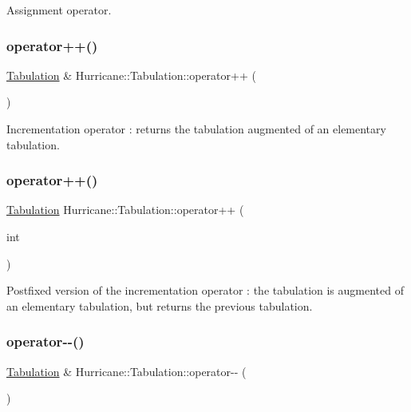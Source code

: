 Assignment operator. \mbox{\label{classHurricane_1_1Tabulation_ad108353099b0755a45a18ec1ab6c0b7c}} 
\subsubsection{\texorpdfstring{operator++()}{operator++()}\hspace{0.1cm}{\footnotesize\ttfamily [1/2]}}
{\footnotesize\ttfamily \mbox{\hyperlink{classHurricane_1_1Tabulation}{Tabulation}} \& Hurricane\+::\+Tabulation\+::operator++ (\begin{DoxyParamCaption}{ }\end{DoxyParamCaption})}

Incrementation operator \+: returns the tabulation augmented of an elementary tabulation. \mbox{\label{classHurricane_1_1Tabulation_ae609e34474086ac1b9748368d798acae}} 
\subsubsection{\texorpdfstring{operator++()}{operator++()}\hspace{0.1cm}{\footnotesize\ttfamily [2/2]}}
{\footnotesize\ttfamily \mbox{\hyperlink{classHurricane_1_1Tabulation}{Tabulation}} Hurricane\+::\+Tabulation\+::operator++ (\begin{DoxyParamCaption}\item[{int}]{ }\end{DoxyParamCaption})}

Postfixed version of the incrementation operator \+: the tabulation is augmented of an elementary tabulation, but returns the previous tabulation. \mbox{\label{classHurricane_1_1Tabulation_af95446070605eb5d2ce89e9b8b3049be}} 
\subsubsection{\texorpdfstring{operator-\/-\/()}{operator--()}\hspace{0.1cm}{\footnotesize\ttfamily [1/2]}}
{\footnotesize\ttfamily \mbox{\hyperlink{classHurricane_1_1Tabulation}{Tabulation}} \& Hurricane\+::\+Tabulation\+::operator-\/-\/ (\begin{DoxyParamCaption}{ }\end{DoxyParamCaption})}

